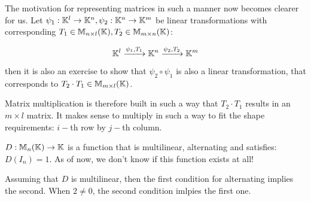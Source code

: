 
\begin{motivation}
    The motivation for representing matrices in such a manner now becomes clearer for us. Let \(\psi_1: \mathbb{K}^l \to \mathbb{K}^n, \psi_2: \mathbb{K}^n \to \mathbb{K}^m\) be linear transformations with corresponding \(T_1 \in \mathbb{M}_{n \times l}(\mathbb{K}), T_2 \in \mathbb{M}_{m \times n}(\mathbb{K})\):

    \[
        \mathbb{K}^l \xrightarrow{\psi_1, T_1} \mathbb{K}^n \xrightarrow{\psi_2, T_2} \mathbb{K}^m
    \]

    then it is also an exercise to show that \(\psi_2 \circ \psi_1\) is also a linear transformation, that corresponds to \(T_2 \cdot T_1 \in \mathbb{M}_{m \times l}(\mathbb{K})\).

    Matrix multiplication is therefore built in such a way that \(T_2 \cdot T_1\) results in an \(m \times l\) matrix. It makes sense to multiply in such a way to fit the shape requirements: \(i-\)th row by \(j-\)th column.
\end{motivation}

\begin{recall}
    \(D: \mathbb{M}_n(\mathbb{K}) \to \mathbb{K}\) is a function that is multilinear, alternating and satisfies: \(D(I_n) = 1\). As of now, we don't know if this function exists at all!
\end{recall}

\begin{remark}
    Assuming that \(D\) is multilinear, then the first condition for alternating implies the second. When \(2 \neq 0\), the second condition imlpies the first one.
\end{remark}

